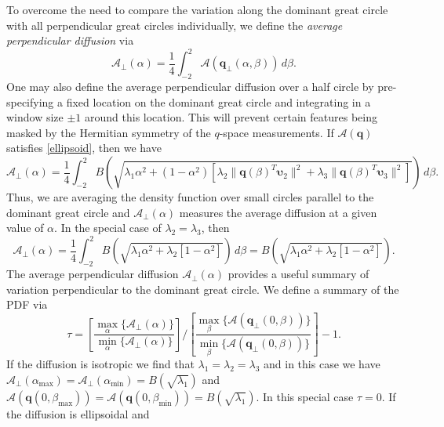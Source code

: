 \documentclass[dvips,aoas,preprint]{imsart}
\numberwithin{equation}{section}
\theoremstyle{plain}
\newcommand{\q}{\mathbf{q}}
\newcommand{\bu}{\bs{\upsilon}}
\newcommand{\cA}{\mathcal{A}}
\newcommand{\bs}[1]{\boldsymbol{#1}}
\begin{document}
To overcome the need to compare the variation along the dominant great
circle with all perpendicular great circles individually, we define
the {\em average perpendicular diffusion} via
\begin{equation}\label{e:averagecont}
  \cA_\perp(\alpha) = \frac{1}{4}\int_{-2}^2
  \cA\left(\q_\perp(\alpha,\beta)\right) \, d\beta.
\end{equation}
One may also define the average perpendicular diffusion over a half
circle by pre-specifying a fixed location on the dominant great circle
and integrating in a window size $\pm1$ around this location.  This
will prevent certain features being masked by the Hermitian symmetry
of the $q$-space measurements.  If $\cA(\q)$ satisfies
\eqref{ellipsoid}, then we have
\begin{equation}\label{e:averagecont2}
  \cA_\perp(\alpha) = \frac{1}{4}\int_{-2}^2
  B\left(\sqrt{\lambda_1\alpha^2 + \left(1-\alpha^2\right) \left[\lambda_2
  \|\q(\beta)^T \bu_2\|^2 + \lambda_3 \|\q(\beta)^T\bu_3\|^2
  \right]}\right) \, d\beta.
\end{equation}
Thus, we are averaging the density function over small circles
parallel to the dominant great circle and $\cA_\perp(\alpha)$ measures
the average diffusion at a given value of $\alpha$.  In the special
case of $\lambda_2=\lambda_3$, then
\begin{equation}\label{e:averagecont3}
  \cA_\perp(\alpha) = \frac{1}{4} \int_{-2}^2 B\left(\sqrt{\lambda_1
  \alpha^2 + \lambda_2 \left[1-\alpha^2\right]}\right) \, d\beta =
  B\left(\sqrt{\lambda_1 \alpha^2 + \lambda_2 \left[1-\alpha^2\right]}\right).
\end{equation}
The average perpendicular diffusion $\cA_\perp(\alpha)$ provides a
useful summary of variation perpendicular to the dominant great
circle.  We define a summary of the PDF via
\begin{equation}\label{e:tau}
 \tau = \left[\frac{\max_{\alpha}\{\cA_\perp(\alpha)\}}
   {\min_{\alpha}\{\cA_\perp(\alpha)\}}\right] \bigg/
   \left[\frac{\max_{\beta}\{\cA(\q_{\perp}(0,\beta))\}}
     {\min_{\beta}\{\cA(\q_{\perp}(0,\beta))\}}\right] - 1. 
\end{equation}
If the diffusion is isotropic we find that
$\lambda_1=\lambda_2=\lambda_3$ and in this case we have
${\cA}_\perp(\alpha_\text{max}) = {\cA}_\perp(\alpha_\text{min}) =
B\left(\sqrt{\lambda_1}\right)$ and $\cA(\q(0,\beta_\text{max})) =
\cA(\q(0,\beta_\text{min})) = B\left(\sqrt{\lambda_1}\right)$.  In
this special case $\tau=0$.  If the diffusion is ellipsoidal and
\end{document}

